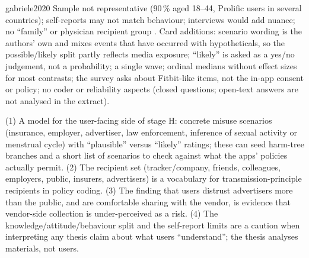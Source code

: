 \begin{papercard}{gabriele2020}
 Sample not representative (90\,\% aged 18--44, Prolific users in several countries); self-reports may not match behaviour; interviews would add nuance; no ``family'' or physician recipient group . Card additions: scenario wording is the authors' own and mixes events that have occurred with hypotheticals, so the possible/likely split partly reflects media exposure; ``likely'' is asked as a yes/no judgement, not a probability; a single wave; ordinal medians without effect sizes for most contrasts; the survey asks about Fitbit-like items, not the in-app consent or policy; no coder or reliability aspects (closed questions; open-text answers are not analysed in the extract).

 (1) A model for the user-facing side of stage H: concrete misuse scenarios (insurance, employer, advertiser, law enforcement, inference of sexual activity or menstrual cycle) with ``plausible'' versus ``likely'' ratings; these can seed harm-tree branches and a short list of scenarios to check against what the apps' policies actually permit. (2) The recipient set (tracker/company, friends, colleagues, employers, public, insurers, advertisers) is a vocabulary for transmission-principle recipients in policy coding. (3) The finding that users distrust advertisers more than the public, and are comfortable sharing with the vendor, is evidence that vendor-side collection is under-perceived as a risk. (4) The knowledge/attitude/behaviour split and the self-report limits are a caution when interpreting any thesis claim about what users ``understand''; the thesis analyses materials, not users.
\end{papercard}
